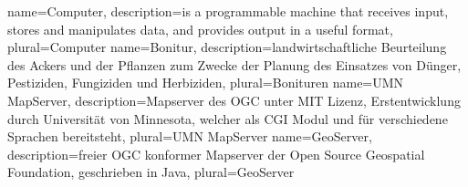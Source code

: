 {
  name=Computer,
  description={is a programmable machine that receives input,
               stores and manipulates data, and provides
               output in a useful format},
  plural=Computer
}
{
  name=Bonitur,
  description={landwirtschaftliche Beurteilung des Ackers und der Pflanzen zum Zwecke der Planung des Einsatzes von Dünger, Pestiziden, Fungiziden und Herbiziden},
  plural=Bonituren
}
{
  name=UMN MapServer,
  description={Mapserver des OGC unter MIT Lizenz, Erstentwicklung durch Universität von Minnesota, welcher als CGI Modul und für verschiedene Sprachen  bereitsteht},
  plural=UMN MapServer
}
{
  name=GeoServer,
  description={freier OGC konformer Mapserver der Open Source Geospatial Foundation, geschrieben in Java},
  plural=GeoServer
}